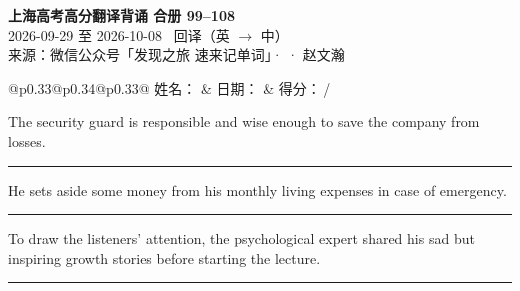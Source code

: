 \documentclass[11pt,a4paper]{article}
\newcommand{\num}[1]{\makebox[1.9em][r]{#1.}\hspace{0.3em}}
\newcommand{\wline}{\noindent\rule{\linewidth}{0.4pt}}
\begin{document}
\pagestyle{plain}
\begin{center}
{\LARGE\bfseries 上海高考高分翻译背诵 \quad 合册 99–108}\\[0.25em]
{\large 2026-09-29 至 2026-10-08 \quad\ 回译（英 $\to$ 中）}\\[0.35em]
{\footnotesize 来源：微信公众号「发现之旅 速来记单词」·  · 赵文瀚}
\end{center}

\vspace{0.4em}
\noindent\begin{tabular}{@{}p{0.33\textwidth}@{}p{0.34\textwidth}@{}p{0.33\textwidth}@{}}
姓名：\underline{\hspace{2.0cm}} & 日期：\underline{\hspace{2.0cm}} & 得分：\underline{\hspace{1.4cm}}\,/ \\
\end{tabular}

\vspace{0.5em}

\vspace{0.8em}
\vspace{0.35em}\vspace{0.15em}

\begin{minipage}{\linewidth}

\num{1}The security guard is responsible and wise enough to save the company from losses.

\vspace{0.25em}

\wline

\end{minipage}

\begin{minipage}{\linewidth}

\num{2}He sets  aside some money from his monthly living expenses in case of emergency.

\vspace{0.25em}

\wline

\end{minipage}

\begin{minipage}{\linewidth}

\num{3}To draw the listeners’ attention, the psychological expert shared his sad but inspiring growth stories before starting the lecture.

\vspace{0.25em}

\wline

\end{minipage}
\end{document}
